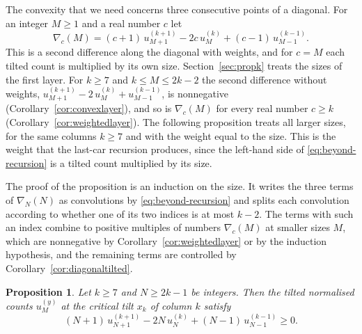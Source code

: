 \documentclass{amsart}
\newtheorem{proposition}[theorem]{Proposition}
\theoremstyle{definition}
\theoremstyle{remark}
\numberwithin{equation}{section}
\begin{document}
The convexity that we need concerns three consecutive points of a diagonal.
For an integer $M\ge1$ and a real number $c$ let
\begin{equation}\label{eq:beyond-weighted}
\nabla_c(M)=(c+1)\,u^{(k+1)}_{M+1}-2c\,u^{(k)}_M+(c-1)\,u^{(k-1)}_{M-1} .
\end{equation}
This is a second difference along the diagonal with weights, and for $c=M$
each tilted count is
multiplied by its own size. Section~\ref{sec:propk} treats the sizes of the
first layer. For $k\ge7$ and $k\le M\le2k-2$ the second difference without
weights, $u^{(k+1)}_{M+1}-2\,u^{(k)}_M+u^{(k-1)}_{M-1}$, is nonnegative
(Corollary~\ref{cor:convexlayer}), and so is $\nabla_c(M)$ for every real
number $c\ge k$ (Corollary~\ref{cor:weightedlayer}). The following
proposition treats all larger sizes, for the same columns $k\ge7$ and with
the weight equal to the size. This is the weight that the last-car recursion
produces, since the left-hand side of \eqref{eq:beyond-recursion} is a
tilted count multiplied by its size.

The proof of the proposition is an induction on the size. It writes the three
terms of $\nabla_N(N)$ as convolutions by \eqref{eq:beyond-recursion} and
splits each convolution according to whether one of its two indices is at
most $k-2$. The terms with such an index combine to positive multiples of
numbers $\nabla_c(M)$ at smaller sizes $M$, which are nonnegative by
Corollary~\ref{cor:weightedlayer} or by the induction hypothesis, and the
remaining terms are controlled by Corollary~\ref{cor:diagonaltilted}.

\begin{proposition}\label{prop:weightedbeyond}
Let $k\ge7$ and $N\ge2k-1$ be integers. Then the tilted normalised counts
$u^{(y)}_M$ at the critical tilt $x_k$ of column $k$ satisfy
\[
(N+1)\,u^{(k+1)}_{N+1}-2N\,u^{(k)}_N+(N-1)\,u^{(k-1)}_{N-1}\ge0 .
\]
\end{proposition}
\end{document}

